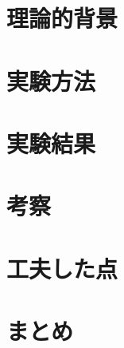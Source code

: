 \documentclass[dvipdfmx]{jsarticle}
\begin{document}

\section{理論的背景} %

\section{実験方法} %

\section{実験結果}

\section{考察} %

\section{工夫した点} %

\section{まとめ} %


\end{document}
